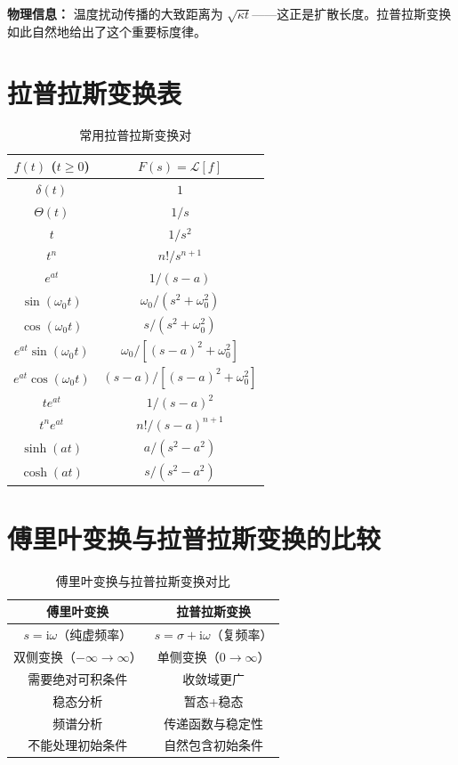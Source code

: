 \textbf{物理信息：} 温度扰动传播的大致距离为 $\sqrt{\kappa t}$——这正是扩散长度。拉普拉斯变换如此自然地给出了这个重要标度律。

\section*{拉普拉斯变换表}

\begin{table}[h]
\centering
\caption{常用拉普拉斯变换对}
\label{tab:laplace_table}
\begin{tabular}{c|c}
\toprule
$f(t)$ ($t\geq0$) & $F(s) = \mathcal{L}[f]$ \\
\midrule
$\delta(t)$ & $1$ \\
$\Theta(t)$ & $1/s$ \\
$t$ & $1/s^2$ \\
$t^n$ & $n!/s^{n+1}$ \\
$e^{at}$ & $1/(s-a)$ \\
$\sin(\omega_0 t)$ & $\omega_0/(s^2+\omega_0^2)$ \\
$\cos(\omega_0 t)$ & $s/(s^2+\omega_0^2)$ \\
$e^{at}\sin(\omega_0 t)$ & $\omega_0/[(s-a)^2+\omega_0^2]$ \\
$e^{at}\cos(\omega_0 t)$ & $(s-a)/[(s-a)^2+\omega_0^2]$ \\
$t e^{at}$ & $1/(s-a)^2$ \\
$t^n e^{at}$ & $n!/(s-a)^{n+1}$ \\
$\sinh(at)$ & $a/(s^2-a^2)$ \\
$\cosh(at)$ & $s/(s^2-a^2)$ \\
\bottomrule
\end{tabular}
\end{table}

\section{傅里叶变换与拉普拉斯变换的比较}

\begin{table}[h]
\centering
\caption{傅里叶变换与拉普拉斯变换对比}
\label{tab:ft_vs_lt}
\begin{tabular}{c|c}
\toprule
傅里叶变换 & 拉普拉斯变换 \\
\midrule
$s = \mathrm{i}\omega$（纯虚频率） & $s = \sigma + \mathrm{i}\omega$（复频率） \\
双侧变换（$-\infty\to\infty$） & 单侧变换（$0\to\infty$） \\
需要绝对可积条件 & 收敛域更广 \\
稳态分析 & 暂态+稳态 \\
频谱分析 & 传递函数与稳定性 \\
不能处理初始条件 & 自然包含初始条件 \\
\bottomrule
\end{tabular}
\end{table}

